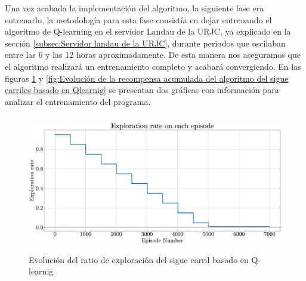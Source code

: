 \begin{itemize}
\bigskip

Una vez acabada la implementación del algoritmo, la siguiente fase era entrenarlo, la metodología para esta fase consistía en dejar entrenando el algoritmo de Q-learning en el servidor Landau de la \ac{URJC}, ya explicado en la sección \ref{subsec:Servidor landau de la URJC}, durante periodos que oscilaban entre las 6 y las 12 horas aproximadamente. De esta manera nos aseguramos que el algoritmo realizará un entrenamiento completo y acabará convergiendo. En las figuras \ref{fig:Evolución del ratio de exploración del algoritmo Qlearnig} y \ref{fig:Evolución de la recompensa acumulada del algoritmo del sigue carriles basado en Qlearnig} se presentan dos gráficas con información para analizar el entrenamiento del programa.

\bigskip

  \begin{figure}[h]
    \centering
    \includegraphics[height=6cm]{imagenes/cap4/sigue_carriles_qlearning/exploration_rate.pdf}
    \caption{Evolución del ratio de exploración del sigue carril basado en Q-learnig}
    \label{fig:Evolución del ratio de exploración del algoritmo Qlearnig}
\end{figure}
        
\end{itemize}

